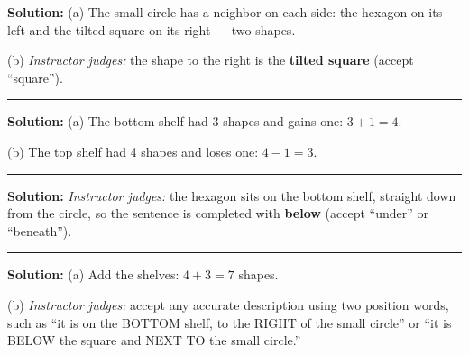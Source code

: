 \documentclass[12pt]{article}
\begin{document}
\textbf{Solution:} (a) The small circle has a neighbor on each side: the
hexagon on its left and the tilted square on its right --- two shapes.

(b) \emph{Instructor judges:} the shape to the right is the \textbf{tilted
square} (accept ``square'').

\vspace{0.2cm}\noindent\rule{\linewidth}{0.2pt}\vspace{0.1cm}


\textbf{Solution:} (a) The bottom shelf had 3 shapes and gains one:
$3 + 1 = 4$. 

(b) The top shelf had 4 shapes and loses one: $4 - 1 = 3$. 

\vspace{0.2cm}\noindent\rule{\linewidth}{0.2pt}\vspace{0.1cm}


\textbf{Solution:} \emph{Instructor judges:} the hexagon sits on the bottom
shelf, straight down from the circle, so the sentence is completed with
\textbf{below} (accept ``under'' or ``beneath'').

\vspace{0.2cm}\noindent\rule{\linewidth}{0.2pt}\vspace{0.1cm}


\textbf{Solution:} (a) Add the shelves: $4 + 3 = 7$ shapes. 

(b) \emph{Instructor judges:} accept any accurate description using two
position words, such as ``it is on the BOTTOM shelf, to the RIGHT of the
small circle'' or ``it is BELOW the square and NEXT TO the small circle.''
\end{document}
